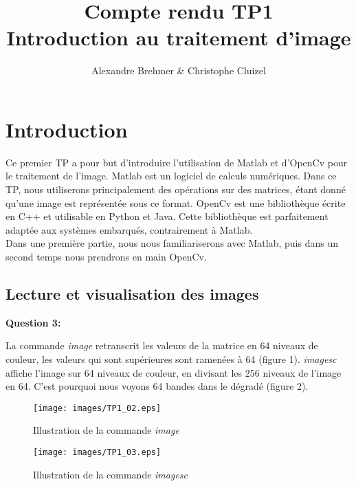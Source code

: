 \documentclass{article}
\title{Compte rendu TP1 \\ Introduction au traitement d'image}
\author{Alexandre Brehmer \& Christophe Cluizel}
\begin{document}
 \maketitle
 \tableofcontents
 \newpage

 
 \section{Introduction}
 Ce premier TP a pour but d'introduire l'utilisation de Matlab et d'OpenCv pour le traitement de l'image. Matlab est un logiciel de calculs numériques. Dans ce TP, nous utiliserons principalement des opérations sur des matrices, étant donné qu'une image est représentée sous ce format. OpenCv est une bibliothèque écrite en C++ et utilisable en Python et Java. Cette bibliothèque est parfaitement adaptée aux systèmes embarqués, contrairement à Matlab. \\
 
 Dans une première partie, nous nous familiariserons avec Matlab, puis dans un second temps nous prendrons en main OpenCv. 
 
 \subsection{Lecture et visualisation des images}
 
 \textbf{Question 3:}
 
 La commande \emph{image} retranscrit les valeurs de la matrice en 64 niveaux de couleur, les valeurs qui sont supérieures sont ramenées à 64 (figure 1). \emph{imagesc} affiche l'image sur 64 niveaux de couleur, en divisant les 256 niveaux de l'image en 64. C'est pourquoi nous voyons 64 bandes dans le dégradé (figure 2). \\
 
 \begin{figure}[h!]
	\begin{center}
	  \texttt{[image: images/TP1\_02.eps]}
	\end{center}
	\caption{Illustration de la commande \emph{image}}
    \end{figure}
    
    \begin{figure}[h!]
	\begin{center}
	  \texttt{[image: images/TP1\_03.eps]}
	\end{center}
	\caption{Illustration de la commande \emph{imagesc}}
    \end{figure}
    
\end{document}

